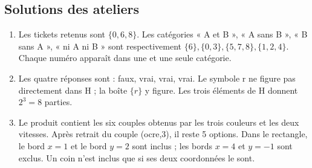 \subsection{Solutions des ateliers}
\begin{enumerate}
\item Les tickets retenus sont $\{0,6,8\}$. Les catégories « A et B », « A sans B », « B sans A », « ni A ni B » sont respectivement $\{6\}, \{0,3\}, \{5,7,8\}, \{1,2,4\}$. Chaque numéro apparaît dans une et une seule catégorie.
\item Les quatre réponses sont : faux, vrai, vrai, vrai. Le symbole r ne figure pas directement dans H ; la boîte $\{r\}$ y figure. Les trois éléments de H donnent $2^3=8$ parties.
\item Le produit contient les six couples obtenus par les trois couleurs et les deux vitesses. Après retrait du couple (ocre,3), il reste 5 options. Dans le rectangle, le bord $x=1$ et le bord $y=2$ sont inclus ; les bords $x=4$ et $y=-1$ sont exclus. Un coin n'est inclus que si ses deux coordonnées le sont.
\end{enumerate}
